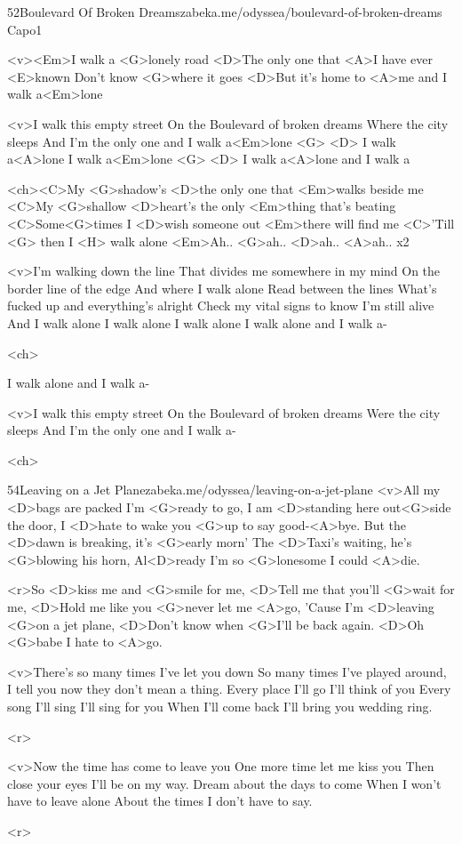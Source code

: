 \begin{song}{52}{Boulevard Of Broken Dreams}{zabeka.me/odyssea/boulevard-of-broken-dreams}
	Capo1

	<v><Em>I walk a <G>lonely road
	<D>The only one that <A>I have ever <E>known
	Don't know <G>where it goes
	<D>But it's home to <A>me and I walk a<Em>lone

	<v>I walk this empty street
	On the Boulevard of broken dreams
	Where the city sleeps
	And I'm the only one and I walk a<Em>lone <G>
	<D> I walk a<A>lone I walk a<Em>lone <G>
	<D> I walk a<A>lone and I walk a

	<ch><C>My <G>shadow's <D>the only one that <Em>walks beside me
	<C>My <G>shallow <D>heart's the only <Em>thing that's beating
	<C>Some<G>times I <D>wish someone out <Em>there will find me
	<C>'Till <G> then I <H> walk alone
	<Em>Ah.. <G>ah.. <D>ah.. <A>ah.. x2

	<v>I'm walking down the line
	That divides me somewhere in my mind
	On the border line of the edge
	And where I walk alone
	Read between the lines
	What's fucked up and everything's alright
	Check my vital signs to know I'm still alive
	And I walk alone
	I walk alone I walk alone
	I walk alone and I walk a-

	<ch>

	I walk alone and I walk a-

	<v>I walk this empty street
	On the Boulevard of broken dreams
	Were the city sleeps
	And I'm the only one and I walk a-

	<ch>

\end{song}
\begin{song}{54}{Leaving on a Jet Plane}{zabeka.me/odyssea/leaving-on-a-jet-plane}
	<v>All my <D>bags are packed I'm <G>ready to go,
	I am <D>standing here out<G>side the door,
	I <D>hate to wake you <G>up to say good-<A>bye.
	But the <D>dawn is breaking, it's <G>early morn'
	The <D>Taxi's waiting, he's <G>blowing his horn,
	Al<D>ready I'm so <G>lonesome I could <A>die.

	<r>So <D>kiss me and <G>smile for me,
	<D>Tell me that you'll <G>wait for me,
	<D>Hold me like you <G>never let me <A>go,
	'Cause I'm <D>leaving <G>on a jet plane,
	<D>Don't know when <G>I'll be back again.
	<D>Oh <G>babe I hate to <A>go.

	<v>There's so many times I've let you down
	So many times I've played around,
	I tell you now they don't mean a thing.
	Every place I'll go I'll think of you
	Every song I'll sing I'll sing for you
	When I'll come back I'll bring you wedding ring.

	<r>

	<v>Now the time has come to leave you
	One more time let me kiss you
	Then close your eyes I'll be on my way.
	Dream about the days to come
	When I won't have to leave alone
	About the times I don't have to say.

	<r>
\end{song}
